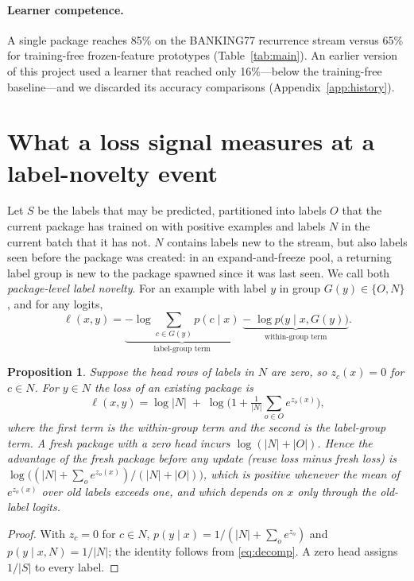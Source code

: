 \documentclass[10pt]{article}
\newtheorem{proposition}{Proposition}
\begin{document}
\paragraph{Learner competence.} A single package reaches 85\% on the BANKING77 recurrence stream versus 65\% for training-free frozen-feature prototypes (Table~\ref{tab:main}). An earlier version of this project used a learner that reached only 16\%---below the training-free baseline---and we discarded its accuracy comparisons (Appendix~\ref{app:history}).

\section{What a loss signal measures at a label-novelty event}
\label{sec:mechanism}

Let $S$ be the labels that may be predicted, partitioned into labels $O$ that the current package has trained on with positive examples and labels $N$ in the current batch that it has not. $N$ contains labels new to the stream, but also labels seen before the package was created: in an expand-and-freeze pool, a returning label group is new to the package spawned since it was last seen. We call both \emph{package-level label novelty}. For an example with label $y$ in group $G(y)\in\{O,N\}$, and for any logits,
\begin{equation}
\ell(x,y) = \underbrace{-\log \textstyle\sum_{c\in G(y)} p(c\mid x)}_{\text{label-group term}}\;\underbrace{-\;\log p\big(y \mid x, G(y)\big)}_{\text{within-group term}} .
\label{eq:decomp}
\end{equation}

\begin{proposition}
\label{prop:novelty}
Suppose the head rows of labels in $N$ are zero, so $z_c(x)=0$ for $c\in N$. For $y\in N$ the loss of an existing package is
\[
\ell(x,y) = \log|N| \;+\; \log\Big(1+\tfrac{1}{|N|}\textstyle\sum_{o\in O} e^{z_o(x)}\Big),
\]
where the first term is the within-group term and the second is the label-group term. A fresh package with a zero head incurs $\log(|N|+|O|)$. Hence the advantage of the fresh package before any update (reuse loss minus fresh loss) is $\log\big((|N|+\sum_{o}e^{z_o(x)})/(|N|+|O|)\big)$, which is positive whenever the mean of $e^{z_o(x)}$ over old labels exceeds one, and which depends on $x$ only through the old-label logits.
\end{proposition}
\begin{proof}
With $z_c=0$ for $c\in N$, $p(y\mid x)=1/(|N|+\sum_o e^{z_o})$ and $p(y\mid x,N)=1/|N|$; the identity follows from \eqref{eq:decomp}. A zero head assigns $1/|S|$ to every label.
\end{proof}
\end{document}
